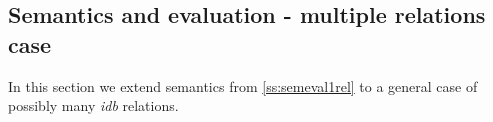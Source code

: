 \begin{comment}

\subsection{Semi-naive evaluation -- one relation case}
\emph{Semi-naive evaluation} is the most basic optimization used in Datalog. In comes from the following observation: in a Datalog program, if some rule $Q$ produced a tuple $t$ based on database instance $I_i$ in the $i$-th iteration of the naive evaluation algorithm, then this rule with produce this tuple in each subsequent iteration, because $I_j \supseteq I_i$ for $j > i$. The goal of this optimization is to avoid such redundant computation. It is achieved by joining only subgoals in the body of each rule which have at least one new answer produced in the previous iteration.

In this section we give the algorithm for semi-naive evaluation in \datalogra and show that this optimization is valid.

\subsubsection{Algorithm}

\begin{figure}[h!]
\narrow{
$R_0 \leftarrow \emptyset, \Delta_0 \leftarrow \emptyset$

$i \leftarrow 0$

do

{\addtolength{\leftskip}{5mm}

$i \leftarrow i + 1$

$T_i \leftarrow \bigcup_{l=1..n} f(R_{i-1})$

$R_i \leftarrow g_k(T_i \cup R_{i-1})$

$\Delta_k^i \leftarrow R_k^i - R_k^{i-1}$

}

while not for all $k$ $\Delta_k^i = \emptyset$

\caption{Semi-Naive evaluation algorithm for \datalogra programs with one \textit{idb} relation.}
}
\end{figure}

\end{comment}


\subsection{Semantics and evaluation - multiple relations case}
In this section we extend \datalogra semantics from \ref{ss:semeval1rel} to a general case of possibly many \emph{idb} relations.

